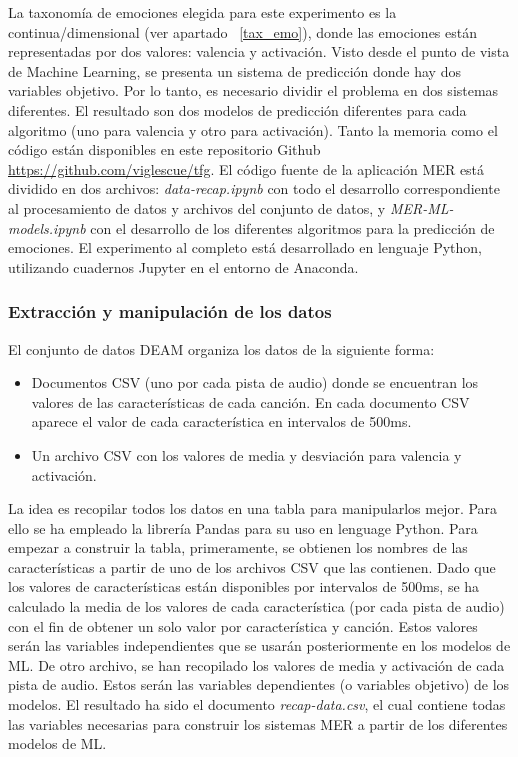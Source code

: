 \documentclass[12pt,a4paper,Spanish]{article}
\begin{document}
La taxonomía de emociones elegida para este experimento es la continua/dimensional (ver apartado ~\ref{tax_emo}), donde las emociones están representadas por dos valores: valencia y activación. Visto desde el punto de vista de Machine Learning, se presenta un sistema de predicción donde hay dos variables objetivo. Por lo tanto, es necesario dividir el problema en dos sistemas diferentes. El resultado son dos modelos de predicción diferentes para cada algoritmo (uno para valencia y otro para activación).
\newline
Tanto la memoria como el código están disponibles en este repositorio Github \url{https://github.com/viglescue/tfg}. El código fuente de la aplicación MER está dividido en dos archivos: \textit{data-recap.ipynb} con todo el desarrollo correspondiente al procesamiento de datos y archivos del conjunto de datos, y \textit{MER-ML-models.ipynb} con el desarrollo de los diferentes algoritmos para la predicción de emociones. El experimento al completo está desarrollado en lenguaje Python, utilizando cuadernos Jupyter en el entorno de Anaconda. 







\subsubsection{Extracción y manipulación de los datos}
El conjunto de datos DEAM \cite{AlajankiEmoInMusicAnalysis} organiza los datos de la siguiente forma:
\begin{itemize}
	\item Documentos CSV (uno por cada pista de audio) donde se encuentran los valores de las características de cada canción. En cada documento CSV aparece el valor de cada característica en intervalos de 500ms.
	\item Un archivo CSV con los valores de media y desviación para valencia y activación.
\end{itemize}
La idea es recopilar todos los datos en una tabla para manipularlos mejor. Para ello se ha empleado la librería Pandas \cite{mckinney-proc-scipy-2010} para su uso en lenguage Python.
\newline
Para empezar a construir la tabla, primeramente, se obtienen los nombres de las características a partir de uno de los archivos CSV que las contienen. Dado que los valores de características están disponibles por intervalos de 500ms, se ha calculado la media de los valores de cada característica (por cada pista de audio) con el fin de obtener un solo valor por característica y canción. Estos valores serán las variables independientes que se usarán posteriormente en los modelos de ML.
\newline
De otro archivo, se han recopilado los valores de media y activación de cada pista de audio. Estos serán las variables dependientes (o variables objetivo) de los modelos.
\newline
El resultado ha sido el documento \textit{recap-data.csv}, el cual contiene todas las variables necesarias para construir los sistemas MER a partir de los diferentes modelos de ML.
\end{document}
